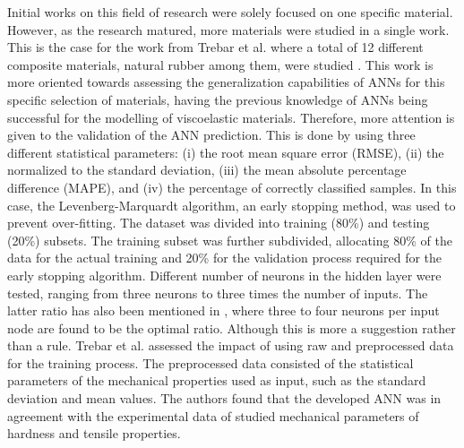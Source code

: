 Initial works on this field of research were solely focused on one specific material. However, as the research matured, more materials were studied in a single work. This is the case for the work from Trebar et al. where a total of 12 different composite materials, natural rubber among them, were studied \cite{trebar2007predicting}. This work is more oriented towards assessing the generalization capabilities of ANNs for this specific selection of materials, having the previous knowledge of ANNs being successful for the modelling of viscoelastic materials. Therefore, more attention is given to the validation of the ANN prediction. This is done by using three different statistical parameters: (i) the root mean square error (RMSE), (ii) the normalized to the standard deviation, (iii) the mean absolute percentage difference (MAPE), and  (iv) the percentage of correctly classified samples. In this case, the Levenberg-Marquardt algorithm, an early stopping method, was used to prevent over-fitting. The dataset was divided into training (80\%) and testing (20\%) subsets. The training subset was further subdivided, allocating 80\% of the data for the actual training and 20\% for the validation process required for the early stopping algorithm. Different number of neurons in the hidden layer were tested, ranging from three neurons to three times the number of inputs. The latter ratio has also been mentioned in \cite{zhang2003artificial}, where three to four neurons per input node are found to be the optimal ratio. Although this is more a suggestion rather than a rule. Trebar et al. assessed the impact of using raw and preprocessed data for the training process. The preprocessed data consisted of the statistical parameters of the mechanical properties used as input, such as the standard deviation and mean values. The authors found that the developed ANN was in agreement with the experimental data of studied mechanical parameters of hardness and tensile properties.

